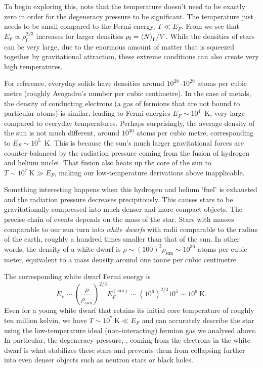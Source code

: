 To begin exploring this, note that the temperature doesn't need to be exactly zero in order for the degeneracy pressure to be significant.
The temperature just needs to be small compared to the Fermi energy, $T \ll E_F$.
From  we see that $E_F \propto \rho_{\text{f}}^{2 / 3}$ increases for larger densities $\rho_{\text{f}} = \left\langle N \right\rangle_{\text{f}} / V$.
While the densities of stars can be very large, due to the enormous amount of matter that is squeezed together by gravitational attraction, these extreme conditions can also create very high temperatures.

For reference, everyday solids have densities around $10^{28}$--$10^{29}$ atoms per cubic metre (roughly Avogadro's number per cubic centimetre).
In the case of metals, the density of conducting electrons (a gas of fermions that are not bound to particular atoms) is similar, leading to Fermi energies $E_F \sim 10^4$~K, very large compared to everyday temperatures. %
Perhaps surprisingly, the average density of the sun is not much different, around $10^{30}$ atoms per cubic metre, corresponding to $E_F \sim 10^5$~K.
This is because the sun's much larger gravitational forces are counter-balanced by the radiation pressure coming from the fusion of hydrogen and helium nuclei.
That fusion also heats up the core of the sun to $T \sim 10^7~\mbox{K} \gg E_F$, making our low-temperature derivations above inapplicable.

Something interesting happens when this hydrogen and helium `fuel' is exhausted and the radiation pressure decreases precipitously.
This causes stars to be gravitationally compressed into much denser and more compact objects.
The precise chain of events depends on the mass of the star.
Stars with masses comparable to our sun turn into \textit{white dwarfs} with radii comparable to the radius of the earth, roughly a hundred times smaller than that of the sun.
In other words, the density of a white dwarf is $\rho \sim (100)^3 \rho_{\text{sun}} \sim 10^{36}$ atoms per cubic meter, equivalent to a mass density around one tonne per cubic centimetre. %

The corresponding white dwarf Fermi energy is
\begin{equation*}
  E_F \sim \left(\frac{\rho}{\rho_{\text{sun}}}\right)^{2 / 3} E_F^{(\text{sun})} \sim \left(10^6\right)^{2 / 3} 10^5 \sim 10^9~\mbox{K}.
\end{equation*}
Even for a young white dwarf that retains its initial core temperature of roughly ten million kelvin, we have $T \sim 10^7~\mbox{K} \ll E_F$ and can accurately describe the star using the low-temperature ideal (non-interacting) fermion gas we analysed above. %
In particular, the degeneracy pressure, , coming from the electrons in the white dwarf is what stabilizes these stars and prevents them from collapsing further into even denser objects such as neutron stars or black holes.

